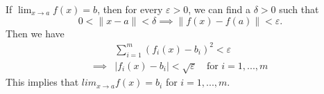 \begin{solution}
    If $\lim_{x\to a}{f(x)} = b$, then for every
    $\varepsilon>0$, we can find a $\delta>0$ such
    that
    $$0<\|x-a\|<\delta\implies\|f(x)-f(a)\|<\varepsilon.$$
    Then we have
    \begin{align*}
        &\sum_{i=1}^{m}{\left(f_i(x)-b_i\right)^2}
    <\varepsilon\\
    \implies &\vert f_i(x)-b_i\vert<\sqrt{\varepsilon}
    \quad \text{for $i=1,...,m$}
    \end{align*}
    This implies that $lim_{x\to a}{f(x)}=b_i$ for
    $i=1,...,m$.
\end{solution}